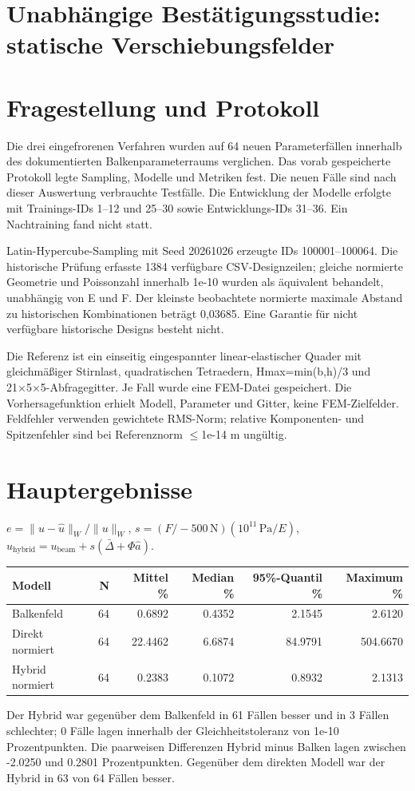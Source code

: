 \documentclass[11pt,a4paper]{article}
\begin{document}
\tableofcontents\newpage
\section*{Unabhängige Bestätigungsstudie: statische Verschiebungsfelder}
\section{Fragestellung und Protokoll}
Die drei eingefrorenen Verfahren wurden auf 64 neuen Parameterfällen innerhalb des dokumentierten Balkenparameterraums verglichen. Das vorab gespeicherte Protokoll legte Sampling, Modelle und Metriken fest. Die neuen Fälle sind nach dieser Auswertung verbrauchte Testfälle. Die Entwicklung der Modelle erfolgte mit Trainings-IDs 1–12 und 25–30 sowie Entwicklungs-IDs 31–36. Ein Nachtraining fand nicht statt.

Latin-Hypercube-Sampling mit Seed 20261026 erzeugte IDs 100001–100064. Die historische Prüfung erfasste 1384 verfügbare CSV-Designzeilen; gleiche normierte Geometrie und Poissonzahl innerhalb 1e-10 wurden als äquivalent behandelt, unabhängig von E und F. Der kleinste beobachtete normierte maximale Abstand zu historischen Kombinationen beträgt 0,03685. Eine Garantie für nicht verfügbare historische Designs besteht nicht.

Die Referenz ist ein einseitig eingespannter linear-elastischer Quader mit gleichmäßiger Stirnlast, quadratischen Tetraedern, Hmax=min(b,h)/3 und 21×5×5-Abfragegitter. Je Fall wurde eine FEM-Datei gespeichert. Die Vorhersagefunktion erhielt Modell, Parameter und Gitter, keine FEM-Zielfelder. Feldfehler verwenden gewichtete RMS-Norm; relative Komponenten- und Spitzenfehler sind bei Referenznorm $\leq$1e-14 m ungültig.

\section{Hauptergebnisse}
$e=\|u-\hat u\|_W/\|u\|_W$, \quad $s=(F/-500\,\mathrm{N})(10^{11}\,\mathrm{Pa}/E)$, \quad $\hat u_\mathrm{hybrid}=u_\mathrm{beam}+s(\bar\Delta+\Phi\hat a)$.
\begin{longtable}{lrrrrr}\toprule
Modell & N & Mittel \% & Median \% & 95\%-Quantil \% & Maximum \%\\\midrule\endhead
Balkenfeld & 64 & 0.6892 & 0.4352 & 2.1545 & 2.6120\\
Direkt normiert & 64 & 22.4462 & 6.6874 & 84.9791 & 504.6670\\
Hybrid normiert & 64 & 0.2383 & 0.1072 & 0.8932 & 2.1313\\
\bottomrule\end{longtable}
Der Hybrid war gegenüber dem Balkenfeld in 61 Fällen besser und in 3 Fällen schlechter; 0 Fälle lagen innerhalb der Gleichheitstoleranz von 1e-10 Prozentpunkten. Die paarweisen Differenzen Hybrid minus Balken lagen zwischen -2.0250 und 0.2801 Prozentpunkten. Gegenüber dem direkten Modell war der Hybrid in 63 von 64 Fällen besser.
\end{document}
